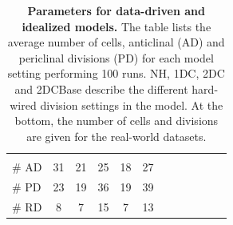 \documentclass[11pt,a4paper, draft]{article}
\begin{document}
\begin{table}
\begin{tabular}{@{}lccccccccccc@{}}
& & & &\\
$\#$ AD & 31 & 21 & 25 & 18 & 27 &&
& & & &\\
$\#$ PD & 23 & 19 & 36 & 19 & 39 &&
& & & &\\
$\#$ RD & 8 & 7 & 15 & 7 & 13 &&
& & & &\\
\bottomrule
\end{tabular}
	\caption[Parameters for data-driven and idealized models.]{\textbf{Parameters for data-driven and idealized models.} The table lists the average number of cells, anticlinal (AD) and periclinal divisions (PD) for each model setting performing 100 runs. NH, 1DC, 2DC and 2DCBase describe the different hard-wired division settings in the model. At the bottom, the number of cells and divisions are given for the real-world datasets.
	}
	\label{tab:modelParameters}
\end{table}

\newpage
\end{document}
